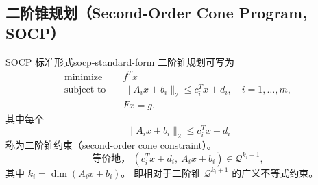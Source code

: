 \documentclass[11pt,a4paper]{article}
\begin{document}
\subsection{二阶锥规划（Second-Order Cone Program, SOCP）}
\begin{definition}{SOCP 标准形式}{socp-standard-form}
二阶锥规划可写为
\[
\begin{aligned}
\text{minimize}\quad & f^Tx\\
\text{subject to}\quad & \|A_ix+b_i\|_2\le c_i^Tx+d_i,\quad i=1,\dots,m,\\
& Fx=g.
\end{aligned}
\]
其中每个
\[
\|A_ix+b_i\|_2\le c_i^Tx+d_i
\]
称为二阶锥约束（second-order cone constraint）。
\[
\text{等价地，}\ (c_i^Tx+d_i,\ A_ix+b_i)\in\mathcal Q^{k_i+1},
\]
其中 $k_i=\dim(A_ix+b_i)$。
即相对于二阶锥 $\mathcal Q^{k_i+1}$ 的广义不等式约束。
\end{definition}
\end{document}
